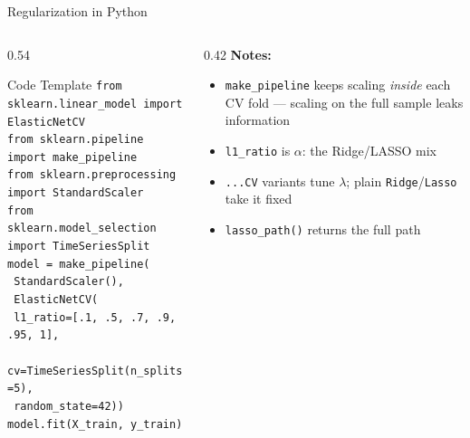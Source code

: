 \documentclass[aspectratio=169, 11pt]{beamer}
\begin{document}
\begin{frame}{Regularization in Python}
  \begin{columns}[T]
    \begin{column}{0.54\textwidth}
      \begin{examplebox}{Code Template}
        {\scriptsize
        \texttt{from sklearn.linear\_model import ElasticNetCV}\\
        \texttt{from sklearn.pipeline import make\_pipeline}\\
        \texttt{from sklearn.preprocessing import StandardScaler}\\
        \texttt{from sklearn.model\_selection import TimeSeriesSplit}\\[2pt]
        \texttt{model = make\_pipeline(}\\
        \texttt{  StandardScaler(),}\\
        \texttt{  ElasticNetCV(}\\
        \texttt{    l1\_ratio=[.1, .5, .7, .9, .95, 1],}\\
        \texttt{    cv=TimeSeriesSplit(n\_splits=5),}\\
        \texttt{    random\_state=42))}\\[2pt]
        \texttt{model.fit(X\_train, y\_train)}
        }
      \end{examplebox}
    \end{column}
    \begin{column}{0.42\textwidth}
      \textbf{Notes:}
      \begin{itemize}\footnotesize\itemsep0pt
        \item \texttt{make\_pipeline} keeps scaling \emph{inside} each CV
              fold --- scaling on the full sample leaks information
        \item \texttt{l1\_ratio} is $\alpha$: the Ridge/LASSO mix
        \item \texttt{...CV} variants tune $\lambda$; plain
              \texttt{Ridge}/\texttt{Lasso} take it fixed
        \item \texttt{lasso\_path()} returns the full path
      \end{itemize}
    \end{column}
  \end{columns}
\end{frame}
\end{document}
